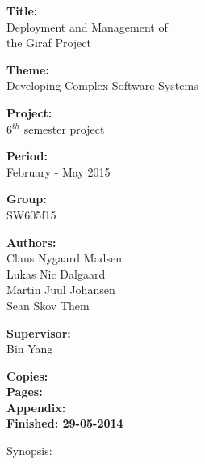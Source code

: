 \begin{minipage}[t]{0.48\textwidth}
\textbf{Title:} \\[5pt]\smallskip\hspace{2ex}
Deployment and Management of\\\bigskip\hspace{2ex}
the Giraf Project

\textbf{Theme:} \\[5pt]\bigskip\hspace{2ex}
Developing Complex Software Systems

\textbf{Project:} \\[5pt]\bigskip\hspace{2ex}
6$^{th}$ semester project

\textbf{Period:} \\[5pt]\bigskip\hspace{2ex}
February - May 2015

\textbf{Group:} \\[5pt]\bigskip\hspace{2ex}
SW605f15	

\textbf{Authors:} \\[5pt]\hspace*{2ex}
Claus Nygaard Madsen\\\hspace*{2ex}
Lukas Nic Dalgaard \\\hspace*{2ex}
Martin Juul Johansen \\\hspace*{2ex}
Sean Skov Them \\\hspace*{2ex}

\textbf{Supervisor:} \\[5pt]\hspace*{2ex}
Bin Yang \\\bigskip\hspace{2ex}

\textbf{Copies: } \\
\textbf{Pages: } \\
\textbf{Appendix: } \\ 
\textbf{Finished: 29-05-2014}

\end{minipage}
\hfill
\begin{minipage}[t]{0.5\textwidth}
\vspace{1cm}
Synopsis: \\[5pt]
\fbox{\parbox{7cm}{\bigskip\bigskip}} %
\end{minipage}

